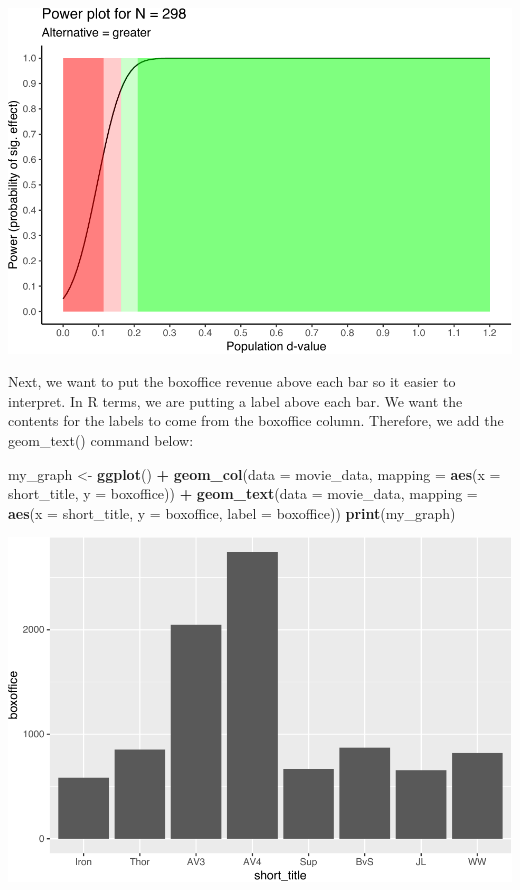 \documentclass[
]{krantz}
\makeatletter
\newenvironment{Shaded}{\begin{snugshade}}{\end{snugshade}}
\newcommand{\DataTypeTok}[1]{\textcolor[rgb]{0.27,0.27,0.27}{#1}}
\newcommand{\KeywordTok}[1]{\textcolor[rgb]{0.27,0.27,0.27}{\textbf{#1}}}
\newcommand{\NormalTok}[1]{#1}
\newcommand{\OperatorTok}[1]{\textcolor[rgb]{0.43,0.43,0.43}{\textbf{#1}}}
\newcommand{\StringTok}[1]{\textcolor[rgb]{0.5,0.5,0.5}{#1}}
\newenvironment{kframe}{%
\medskip{}
\setlength{\fboxsep}{.8em}
 \def\at@end@of@kframe{}%
 \ifinner\ifhmode%
  \def\at@end@of@kframe{\end{minipage}}%
  \begin{minipage}{\columnwidth}%
 \fi\fi%
 \def\FrameCommand##1{\hskip\@totalleftmargin \hskip-\fboxsep
 \colorbox{shadecolor}{##1}\hskip-\fboxsep
     \hskip-\linewidth \hskip-\@totalleftmargin \hskip\columnwidth}%
 \MakeFramed {\advance\hsize-\width
   \@totalleftmargin\z@ \linewidth\hsize
   \@setminipage}}%
 {\par\unskip\endMakeFramed%
 \at@end@of@kframe}
\renewenvironment{Shaded}{\begin{kframe}}{\end{kframe}}
\makeatother
\begin{document}
\includegraphics[width=0.65\linewidth]{bookdown_files/figure-latex/unnamed-chunk-252-1}

Next, we want to put the boxoffice revenue above each bar so it easier to interpret. In R terms, we are putting a label above each bar. We want the contents for the labels to come from the boxoffice column. Therefore, we add the geom\_text() command below:

\begin{Shaded}
\begin{Highlighting}[]
\NormalTok{my_graph <-}\StringTok{ }\KeywordTok{ggplot}\NormalTok{() }\OperatorTok{+}
\StringTok{  }\KeywordTok{geom_col}\NormalTok{(}\DataTypeTok{data =}\NormalTok{ movie_data,}
           \DataTypeTok{mapping =} \KeywordTok{aes}\NormalTok{(}\DataTypeTok{x =}\NormalTok{ short_title, }
                         \DataTypeTok{y =}\NormalTok{ boxoffice)) }\OperatorTok{+}
\StringTok{  }\KeywordTok{geom_text}\NormalTok{(}\DataTypeTok{data =}\NormalTok{ movie_data, }
           \DataTypeTok{mapping =} \KeywordTok{aes}\NormalTok{(}\DataTypeTok{x =}\NormalTok{ short_title, }
                         \DataTypeTok{y =}\NormalTok{ boxoffice, }
                         \DataTypeTok{label =}\NormalTok{ boxoffice))}
\KeywordTok{print}\NormalTok{(my_graph)}
\end{Highlighting}
\end{Shaded}

\includegraphics[width=0.65\linewidth]{bookdown_files/figure-latex/unnamed-chunk-253-1}
\end{document}
